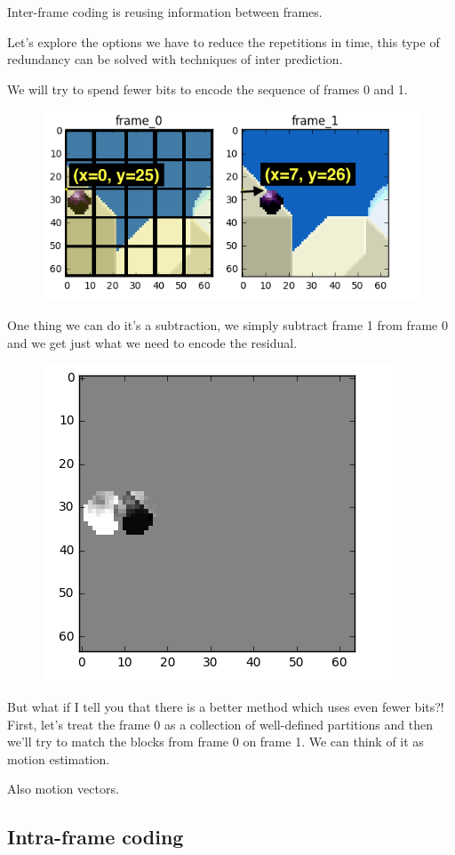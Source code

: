 Inter-frame coding is reusing information between frames.

Let's explore the options we have to reduce the repetitions in time, this type of redundancy can be solved with techniques of inter prediction.

We will try to spend fewer bits to encode the sequence of frames 0 and 1.

\begin{figure}[H]
	\centering
	\includegraphics[width=.5\textwidth]{img/rozdzial2/original_frames_motion_estimation}
\end{figure}

One thing we can do it's a subtraction, we simply subtract frame 1 from frame 0 and we get just what we need to encode the residual.

\begin{figure}[H]
	\centering
	\includegraphics[width=.5\textwidth]{img/rozdzial2/difference_frames}
\end{figure}

But what if I tell you that there is a better method which uses even fewer bits?! First, let's treat the frame 0 as a collection of well-defined partitions and then we'll try to match the blocks from frame 0 on frame 1. We can think of it as motion estimation.

Also motion vectors.

\subsection{Intra-frame coding}

